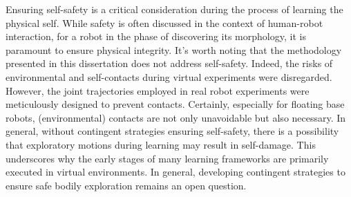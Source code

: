 \documentclass[12pt, a4paper]{article}
\newcommand{\redtext}[1]{\textcolor{red}{#1}}
\begin{document}
Ensuring self-safety is a critical consideration during the process of learning the physical self. While safety is often discussed in the context of human-robot interaction, for a robot in the phase of discovering its morphology, it is paramount to ensure physical integrity. It's worth noting that the methodology presented in this dissertation does not address self-safety. Indeed, the risks of environmental and self-contacts during virtual experiments were disregarded. However, the joint trajectories employed in real robot experiments were meticulously designed to prevent contacts. Certainly, especially for floating base robots, (environmental) contacts are not only unavoidable but also necessary. In general, without contingent strategies ensuring self-safety, there is a possibility that exploratory motions during learning may result in self-damage. This underscores why the early stages of many learning frameworks are primarily executed in virtual environments. In general, developing contingent strategies to ensure safe bodily exploration remains an open question.
%
%
\end{document}
